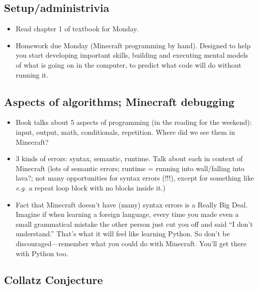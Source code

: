 \documentclass{article}
\newcommand{\eg}{\emph{e.g.}\xspace}
\begin{document}
\subsection*{Setup/administrivia}

\begin{itemize}
\item Read chapter 1 of textbook for Monday.
\item Homework due Monday (Minecraft programming by hand).
  Designed to help you start developing important skills, building and
  executing mental models of what is going on in the computer, to
  predict what code will do without running it.
\end{itemize}

\subsection*{Aspects of algorithms; Minecraft debugging}

\begin{itemize}
\item Book talks about 5 aspects of programming (in the reading for the
  weekend): input, output, math, conditionals, repetition.  Where did
  we see them in Minecraft?
\item 3 kinds of errors: syntax, semantic, runtime.  Talk
  about each in context of Minecraft (lots of semantic errors; runtime
  = running into wall/falling into lava?; not many opportunities for
  syntax errors (!!!), except for something like \eg a repeat loop
  block with no blocks inside it.)
\item Fact that Minecraft doesn't have (many) syntax errors is a
  Really Big Deal.  Imagine if when learning a foreign language, every
  time you made even a small grammatical mistake the other person just
  cut you off and said ``I don't understand.''  That's what it will
  feel like learning Python.  So don't be discouraged---remember what
  you could do with Minecraft.  You'll get there with Python
  too.
\end{itemize}

\subsection*{Collatz Conjecture}
\end{document}

